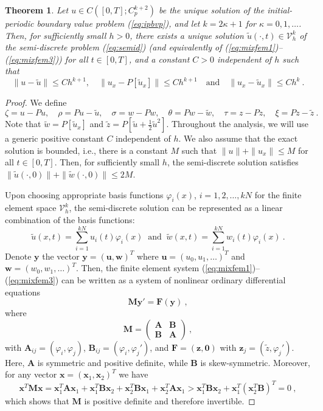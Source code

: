 \documentclass{amsart}
\newcommand{\by}{\mathbf{y}}
\newcommand{\tz}{\tilde{z}}
\newcommand{\bo}{\mathbf{0}}
\newcommand{\bx}{\mathbf{x}}
\newcommand{\bF}{\mathbf{F}}
\newcommand{\bu}{\mathbf{u}}
\newcommand{\bw}{\mathbf{w}}
\newcommand{\bz}{\mathbf{z}}
\newcommand{\bA}{\mathbf{A}}
\newcommand{\bB}{\mathbf{B}}
\newcommand{\bM}{\mathbf{M}}
\newtheorem{theorem}{Theorem}[section]
\begin{document}
\begin{theorem}\label{thrm:Theorem1}
Let $u\in C([0,T];C^{k+2}_p)$ be the unique solution of the initial-periodic boundary value problem (\ref{eq:ipbvp}), and let $k=2\kappa+1$ for $\kappa=0,1,\dots$. Then, for sufficiently small $h>0$, there exists a unique solution $\tilde{u}(\cdot,t)\in \mathcal{V}_h^k$ of the semi-discrete problem (\ref{eq:semid}) (and equivalently of (\ref{eq:mixfem1})--(\ref{eq:mixfem3}))  for all $t\in[0,T]$, and a constant $C>0$ independent of $h$ such that
$$\|u-\tilde{u}\|\leq C h^{k+1}, \quad \|u_x-P[\tilde{u}_x]\|\leq C h^{k+1}\quad \text{and}\quad \|u_x-\tilde{u}_x\|\leq C h^k \ .$$
\end{theorem}
%
\begin{proof}
We define
$$\zeta=u-Pu,\quad \rho=Pu-\tilde{u},\quad \sigma=w-Pw,\quad \theta=Pw-\tilde{w}, \quad\tau=z-Pz,  \quad \xi=Pz-\tilde{z}\ .$$
Note that $\tilde{w}=P[\tilde{u}_x]$ and $\tilde{z}=P[\tilde{u}+\frac{1}{2}\tilde{u}^2]$. 
%
Throughout the analysis, we will use a generic positive constant $C$ independent of $h$.
%
We also assume that the exact solution is bounded, i.e., there is a constant $M$ such that $\|u\|+\|u_x\|\leq M$ for all $t\in[0,T]$. Then, for sufficiently small $h$, the semi-discrete solution satisfies $\|\tilde{u}(\cdot,0)\|+\|\tilde{w}(\cdot,0)\|\leq 2M$.

Upon choosing appropriate basis functions $\varphi_i(x)$, $i=1,2,\dots,kN$ for the finite element space $\mathcal{V}_h^k$, the semi-discrete solution can be represented as a linear combination of the basis functions:
$$\tilde{u}(x,t)=\sum_{i=1}^{kN} u_i(t) \varphi_i(x) \ \text{ and } \ \tilde{w}(x,t)=\sum_{i=1}^{kN} w_i(t)\varphi_i(x)\ .$$
Denote $\by$ the vector $\by=(\bu,\bw)^T$ where $\bu=(u_0,u_1,\dots)^T$ and $\bw=(w_0,w_1,\dots)^T$.
Then, the finite element system (\ref{eq:mixfem1})--(\ref{eq:mixfem3}) can be written as a system of nonlinear ordinary differential equations
\begin{equation}\label{eq:sysnlodes}
   \bM \by' = \bF(\by)\ ,
\end{equation}
where 
$$\bM = \begin{pmatrix}
    \bA & \bB\\
    \bB & \bA
\end{pmatrix}\ ,$$
with $\bA_{ij}=(\varphi_i,\varphi_j)$, $\bB_{ij}=(\varphi_i,\varphi_j')$, and
$\bF=(\bz,\bo)$ with $\bz_j=(\tz,\varphi_j')$. Here, $\bA$ is symmetric and positive definite, while $\bB$ is skew-symmetric. Moreover, for any vector $\bx=(\bx_1, \bx_2)^T$ we have
$$
 \bx^T\bM \bx = \bx_1^T\bA\bx_1+\bx_1^T\bB\bx_2+\bx_2^T\bB\bx_1+\bx_2^T\bA\bx_1> \bx_1^T\bB\bx_2+\bx_1^T(\bx_2^T\bB)^T= 0\ ,
$$
which shows that $\bM$ is positive definite and therefore invertible. 



\end{proof}
\end{document}
